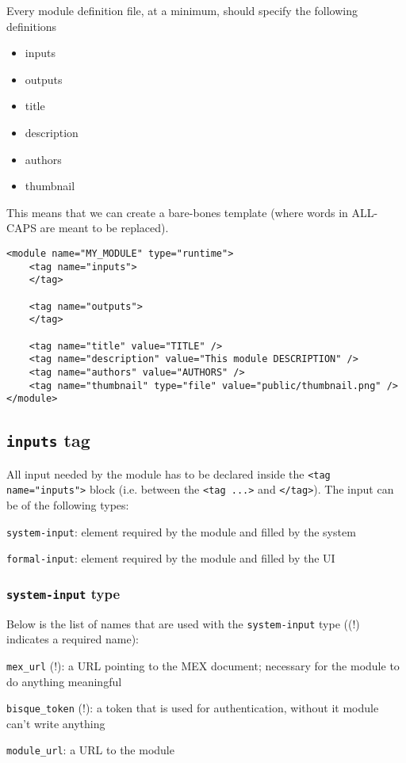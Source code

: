Every module definition file, at a minimum, should specify the following definitions
\begin{itemize}
\setlength{\itemsep}{0.1mm}
\item inputs
\item outputs
\item title
\item description
\item authors
\item thumbnail
\end{itemize}

This means that we can create a bare-bones template (where words in ALL-CAPS are meant to be replaced).
\begin{verbatim}
<module name="MY_MODULE" type="runtime">
    <tag name="inputs">
    </tag>
    
    <tag name="outputs">
    </tag>

    <tag name="title" value="TITLE" />     
    <tag name="description" value="This module DESCRIPTION" />
    <tag name="authors" value="AUTHORS" /> 
    <tag name="thumbnail" type="file" value="public/thumbnail.png" />
</module>
\end{verbatim}


\subsection{\texttt{inputs} tag}
All input needed by the module has to be declared inside the 
\texttt{<tag name="inputs">}  block (i.e. between the \texttt{<tag ...>} and \texttt{</tag>}). The input can be of the following types:
\begin{itemize*}
\item 
\texttt{system-input}: element required by the module and filled by the system
\item 
\texttt{formal-input}: element required by the module and filled by the UI
\end{itemize*}


\subsubsection{\texttt{system-input} type}
Below is the list of names that are used with the \texttt{system-input} type ((!) indicates a required name):
\begin{itemize*}
\item 
\texttt{mex\_url} (!): a URL pointing to the MEX document; necessary for the module to do anything meaningful
\item 
\texttt{bisque\_token} (!): a token that is used for authentication, without it module can't write anything
\item
\texttt{module\_url}:  a URL to the module %
\end{itemize*}

